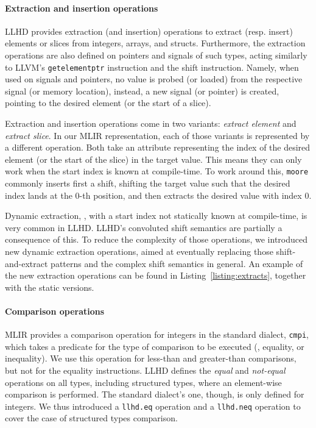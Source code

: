 \paragraph{Extraction and insertion operations}
LLHD provides extraction (and insertion) operations to extract (resp. insert) elements or slices from integers, arrays, and structs. Furthermore, the extraction operations are also defined on pointers and signals of such types, acting similarly to LLVM's \texttt{getelementptr} instruction and the shift instruction. Namely, when used on signals and pointers, no value is probed (or loaded) from the respective signal (or memory location), instead, a new signal (or pointer) is created, pointing to the desired element (or the start of a slice).

Extraction and insertion operations come in two variants: \textit{extract element} and \textit{extract slice}. In our MLIR representation, each of those variants is represented by a different operation. Both take an attribute representing the index of the desired element (or the start of the slice) in the target value. This means they can only work when the start index is known at compile-time. To work around this, \texttt{moore} commonly inserts first a shift, shifting the target value such that the desired index lands at the $0$-th position, and then extracts the desired value with index $0$.

Dynamic extraction, \ie, with a start index not statically known at compile-time, is very common in LLHD. LLHD's convoluted shift semantics are partially a consequence of this. To reduce the complexity of those operations, we introduced new dynamic extraction operations, aimed at eventually replacing those shift-and-extract patterns and the complex shift semantics in general. An example of the new extraction operations can be found in Listing~\ref{listing:extracts}, together with the static versions.


\paragraph{Comparison operations}
MLIR provides a comparison operation for integers in the standard dialect, \texttt{cmpi}, which takes a predicate for the type of comparison to be executed (\eg, equality, or inequality). We use this operation for less-than and greater-than comparisons, but not for the equality instructions. LLHD defines the \textit{equal} and \textit{not-equal} operations on all types, including structured types, where an element-wise comparison is performed. The standard dialect's one, though, is only defined for integers. We thus introduced a \texttt{llhd.eq} operation and a \texttt{llhd.neq} operation to cover the case of structured types comparison.
